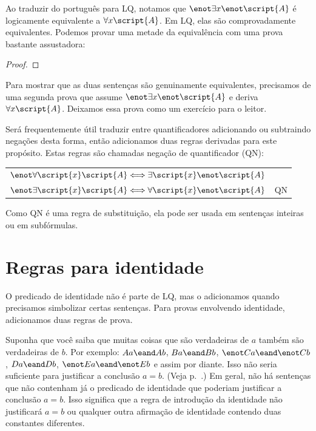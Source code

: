 Ao traduzir do português para LQ, notamos que $\enot\exists x\enot\script{A}$ é logicamente equivalente a $\forall x\script{A}$. Em LQ, elas são comprovadamente equivalentes. Podemos provar uma metade da equivalência com uma prova bastante assustadora:

\begin{proof}
	 
	\open
		\open
			\open
			\close
		\close
	\close
\end{proof}

Para mostrar que as duas sentenças são genuinamente equivalentes, precisamos de uma segunda prova que assume $\enot\exists x\enot\script{A}$ e deriva $\forall x\script{A}$. Deixamos essa prova como um exercício para o leitor.

Será frequentemente útil traduzir entre quantificadores adicionando ou subtraindo negações desta forma, então adicionamos duas regras derivadas para este propósito. Estas regras são chamadas negação de quantificador (QN):
\begin{center}
\begin{tabular}{rl}
$\enot\forall\script{x}\script{A} \Longleftrightarrow \exists\script{x}\enot\script{A}$\\
$\enot\exists\script{x}\script{A} \Longleftrightarrow \forall\script{x}\enot\script{A}$
& QN
\end{tabular}
\end{center}
Como QN é uma regra de substituição, ela pode ser usada em sentenças inteiras ou em subfórmulas.


\section{Regras para identidade}
O predicado de identidade não é parte de LQ, mas o adicionamos quando precisamos simbolizar certas sentenças. Para provas envolvendo identidade, adicionamos duas regras de prova.

Suponha que você saiba que muitas coisas que são verdadeiras de $a$ também são verdadeiras de $b$. Por exemplo: $Aa\eand Ab$, $Ba\eand Bb$, $\enot Ca\eand\enot Cb$, $Da\eand Db$, $\enot Ea\eand\enot Eb$ e assim por diante. Isso não seria suficiente para justificar a conclusão $a=b$. (Veja p.~\pageref{model.nonidentity}.) Em geral, não há sentenças que não contenham já o predicado de identidade que poderiam justificar a conclusão $a=b$. Isso significa que a regra de introdução da identidade não justificará $a=b$ ou qualquer outra afirmação de identidade contendo duas constantes diferentes.

